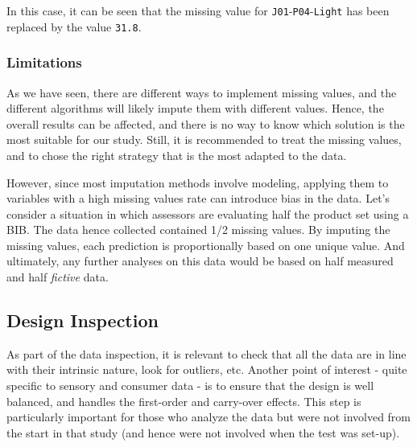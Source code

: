 \documentclass[
]{book}
\newenvironment{Shaded}{\begin{snugshade}}{\end{snugshade}}
\newcommand{\AttributeTok}[1]{\textcolor[rgb]{0.77,0.63,0.00}{#1}}
\newcommand{\DecValTok}[1]{\textcolor[rgb]{0.00,0.00,0.81}{#1}}
\newcommand{\FunctionTok}[1]{\textcolor[rgb]{0.00,0.00,0.00}{#1}}
\newcommand{\NormalTok}[1]{#1}
\newcommand{\SpecialCharTok}[1]{\textcolor[rgb]{0.00,0.00,0.00}{#1}}
\newcommand{\StringTok}[1]{\textcolor[rgb]{0.31,0.60,0.02}{#1}}
\begin{document}
\begin{Shaded}
\end{Shaded}

In this case, it can be seen that the missing value for \texttt{J01}-\texttt{P04}-\texttt{Light} has been replaced by the value \texttt{31.8}.

\hypertarget{limitations}{%
\subsubsection{Limitations}\label{limitations}}

As we have seen, there are different ways to implement missing values, and the different algorithms will likely impute them with different values. Hence, the overall results can be affected, and there is no way to know which solution is the most suitable for our study. Still, it is recommended to treat the missing values, and to chose the right strategy that is the most adapted to the data.

However, since most imputation methods involve modeling, applying them to variables with a high missing values rate can introduce bias in the data. Let's consider a situation in which assessors are evaluating half the product set using a BIB. The data hence collected contained 1/2 missing values. By imputing the missing values, each prediction is proportionally based on one unique value. And ultimately, any further analyses on this data would be based on half measured and half \emph{fictive} data.

\hypertarget{design-inspection}{%
\subsection{Design Inspection}\label{design-inspection}}

As part of the data inspection, it is relevant to check that all the data are in line with their intrinsic nature, look for outliers, etc.
Another point of interest - quite specific to sensory and consumer data - is to ensure that the design is well balanced, and handles the first-order and carry-over effects. This step is particularly important for those who analyze the data but were not involved from the start in that study (and hence were not involved when the test was set-up).
\end{document}
